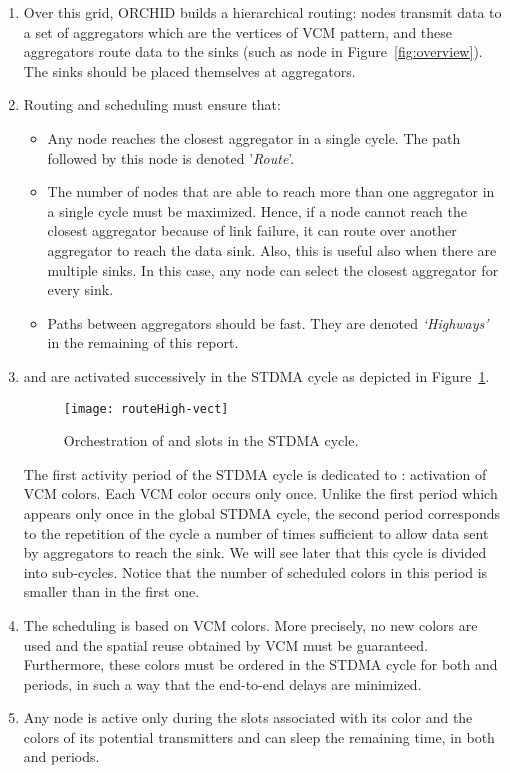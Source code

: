 \begin{enumerate}
\item 
Over this grid, ORCHID builds a hierarchical routing: nodes transmit data to a set of aggregators which are the vertices of VCM pattern, and these aggregators route data to the sinks (such as node  in Figure~\ref{fig:overview}). The sinks should be placed themselves at aggregators.
\item Routing and scheduling must ensure that: 
	\begin{itemize}
	\item Any node reaches the closest aggregator in a single cycle. The path followed by this node is denoted '\textit{Route}'.
	\item The number of nodes that are able to reach more than one aggregator in a single cycle must be maximized. Hence, if a node cannot reach the closest aggregator because of link failure, it can route over another aggregator to reach the data sink. Also, this is useful also when there are multiple sinks. In this case, any node can select the closest aggregator for every sink.
\item Paths between aggregators should be fast. They are denoted \textit{`Highways'} in the remaining of this report.
		\end{itemize}              




\item  and  are activated successively in the STDMA cycle as depicted in Figure~\ref{routeHighways}. 
\begin{figure}[!h]
\centering
\texttt{[image: routeHigh-vect]}
\caption{Orchestration of  and  slots in the STDMA cycle.\label{routeHighways}}
\end{figure}
The first activity period of the STDMA cycle is dedicated to : activation of VCM colors. Each VCM color occurs only once. 
Unlike the first period which appears only once in the global STDMA cycle, the second period corresponds to the repetition of the  cycle a number of times sufficient to allow data sent by aggregators to reach the sink. We will see later that this cycle is divided into sub-cycles. Notice that the number of scheduled colors in this period is smaller than in the first one.
\item The scheduling is based on VCM colors. More precisely, no new colors are used and the spatial reuse obtained by VCM must be guaranteed. Furthermore, these colors must be ordered in the STDMA cycle for both  and  periods, in such a way that the end-to-end delays are minimized.

\item Any node is active only during the slots associated with its color and the colors of its potential transmitters and can sleep the remaining time, in both  and  periods.
\end{enumerate}
